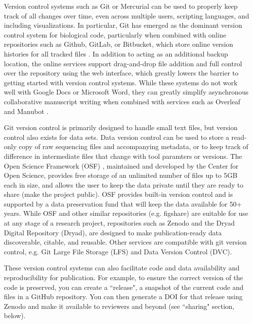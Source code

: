 \documentclass[10pt,letterpaper]{article}
\begin{document}
Version control systems such as Git or Mercurial can be used to properly keep track of all changes over time, even across multiple users, scripting languages, and including visualizations. 
In particular, Git has emerged as the dominant version control system for biological code, particularly when combined with online repositories such as Github, GitLab, or Bitbucket, which store online version histories for all tracked files \cite{ram2013git, blischak2016quick}.
In addition to acting as an additional backup location, the online services support drag-and-drop file addition and full control over the repository using the web interface, which greatly lowers the barrier to getting started with version control systems. 
While these systems do not work well with Google Docs or Microsoft Word, they can greatly simplify asynchronous collaborative manuscript writing when combined with services such as Overleaf and Manubot \cite{himmelstein2019open}. 

Git version control is primarily designed to handle small text files, but version control also exists for data sets.
Data version control can be used to store a read-only copy of raw sequencing files and accompanying metadata, or to keep track of difference in intermediate files that change with tool paramters or versions. 
The Open Science Framework (OSF) \cite{foster2017open}, maintained and developed by the Center for Open Science, provides free storage of an unlimited number of files up to 5GB each in size, and allows the user to keep the data private until they are ready to share (make the project public). 
OSF provides built-in version control and is supported by a data preservation fund that will keep the data available for 50+ years. 
While OSF and other similar repositories (e.g. figshare) are suitable for use at any stage of a research project, repositories such as Zenodo and the Dryad Digital Repository (Dryad), are designed to make publication-ready data discoverable, citable, and reusable. 
Other services are compatible with git version control, e.g. Git Large File Storage (LFS) and Data Version Control (DVC).

These version control systems can also facilitate code and data availability and reproducibility for publication. 
For example, to ensure the correct version of the code is preserved, you can create a ``release", a snapshot of the current code and files in a GitHub repository. 
You can then generate a DOI for that release using Zenodo and make it available to reviewers and beyond (see ``sharing" section, below).
\end{document}
